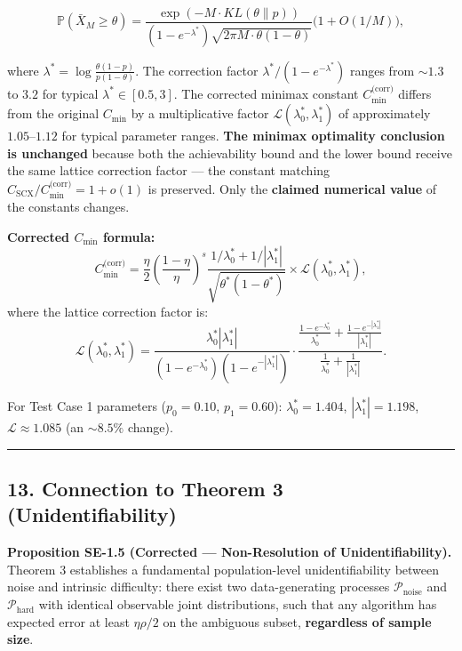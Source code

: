 \documentclass[
  12pt,
]{article}
\begin{document}
\[\mathbb{P}(\bar{X}_M \geq \theta) = \frac{\exp(-M \cdot KL(\theta\|p))}{(1-e^{-\lambda^*}) \sqrt{2\pi M \cdot \theta(1-\theta)}} \bigl(1 + O(1/M)\bigr),\]

where \(\lambda^* = \log\frac{\theta(1-p)}{p(1-\theta)}\). The
correction factor \(\lambda^*/(1-e^{-\lambda^*})\) ranges from
\(\sim 1.3\) to \(3.2\) for typical \(\lambda^* \in [0.5, 3]\). The
corrected minimax constant \(C_{\min}^{\text{(corr)}}\) differs from the
original \(C_{\min}\) by a multiplicative factor
\(\mathcal{L}(\lambda_0^*, \lambda_1^*)\) of approximately
\(1.05\)--\(1.12\) for typical parameter ranges. \textbf{The minimax
optimality conclusion is unchanged} because both the achievability bound
and the lower bound receive the same lattice correction factor --- the
constant matching \(C_{\text{SCX}}/C_{\min}^{\text{(corr)}} = 1 + o(1)\)
is preserved. Only the \textbf{claimed numerical value} of the constants
changes.

\textbf{Corrected \(C_{\min}\) formula:}
\[C_{\min}^{\text{(corr)}} = \frac{\eta}{2} \left(\frac{1-\eta}{\eta}\right)^{s} \frac{1/\lambda_0^* + 1/|\lambda_1^*|}{\sqrt{\theta^*(1-\theta^*)}} \times \mathcal{L}(\lambda_0^*, \lambda_1^*),\]
where the lattice correction factor is:
\[\mathcal{L}(\lambda_0^*, \lambda_1^*) = \frac{\lambda_0^* |\lambda_1^*|}{(1-e^{-\lambda_0^*})(1-e^{-|\lambda_1^*|})} \cdot \frac{\frac{1-e^{-\lambda_0^*}}{\lambda_0^*} + \frac{1-e^{-|\lambda_1^*|}}{|\lambda_1^*|}}{\frac{1}{\lambda_0^*} + \frac{1}{|\lambda_1^*|}}.\]

For Test Case 1 parameters (\(p_0=0.10\), \(p_1=0.60\)):
\(\lambda_0^* = 1.404\), \(|\lambda_1^*| = 1.198\),
\(\mathcal{L} \approx 1.085\) (an \(\sim 8.5\%\) change).

\begin{center}\rule{0.5\linewidth}{0.5pt}\end{center}

\subsection{13. Connection to Theorem 3
(Unidentifiability)}\label{connection-to-theorem-3-unidentifiability}

\textbf{Proposition SE-1.5 (Corrected --- Non-Resolution of
Unidentifiability).} Theorem 3 establishes a fundamental
population-level unidentifiability between noise and intrinsic
difficulty: there exist two data-generating processes
\(\mathcal{P}_{\text{noise}}\) and \(\mathcal{P}_{\text{hard}}\) with
identical observable joint distributions, such that any algorithm has
expected error at least \(\eta\rho/2\) on the ambiguous subset,
\textbf{regardless of sample size}.
\end{document}

